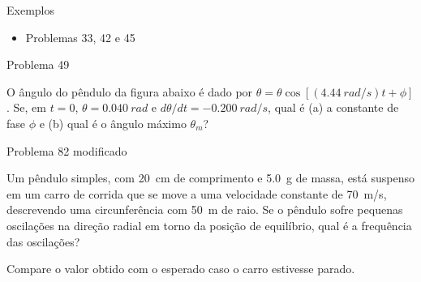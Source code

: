 \begin{frame}{Exemplos}
    \begin{itemize}
        \item Problemas 33, 42 e 45
    \end{itemize}
\end{frame}

\begin{frame}{Problema 49}
    \begin{minipage}{\textwidth}
        O ângulo do pêndulo da figura abaixo é dado por
        \(\theta = \theta \cos{[(\SI{4.44}{rad/s})t+\phi]}\). Se, em \(t=0\), \(\theta=\SI{0.040}{rad}\)
        e \(d\theta/dt = \SI{-0.200}{rad/s}\), qual é (a) a constante de fase \(\phi\) e (b) qual é
        o ângulo máximo \(\theta_m\)?
    \end{minipage}
    \begin{center}
    \end{center}
\end{frame}

\begin{frame}{Problema 82 modificado}
    \begin{minipage}{\textwidth}
        Um pêndulo simples, com \SI{20}{cm} de comprimento e \SI{5.0}{g} de massa, está suspenso
        em um carro de corrida que se move a uma velocidade constante de \SI{70}{m/s}, descrevendo
        uma circunferência com \SI{50}{m} de raio. Se o pêndulo sofre pequenas oscilações na direção
        radial em torno da posição de equilíbrio, qual é a frequência das oscilações?

        \vspace{2cm}
        Compare o valor obtido com o esperado caso o carro estivesse parado.
    \end{minipage}
\end{frame}

